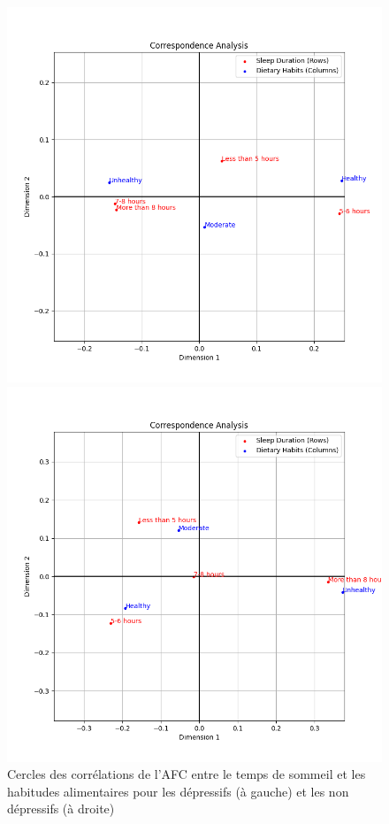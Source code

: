 \begin{figure}[!h]
  \centering
  \begin{minipage}{0.45\textwidth}
    \centering
    \includegraphics[width=\linewidth]{Images/Sleep_Dietary_depressive/Corr_circle.png}
  \end{minipage}\hfill
  \begin{minipage}{0.45\textwidth}
    \centering
    \includegraphics[width=\linewidth]{Images/Sleep_Dietary_non_depressive/Corr_circle.png}
  \end{minipage}  
  \caption{Cercles des corrélations de l'AFC entre le temps de sommeil et les habitudes alimentaires pour les dépressifs (à gauche) et les non dépressifs (à droite)}\label{fig:corrDietarySleep}
\end{figure}


